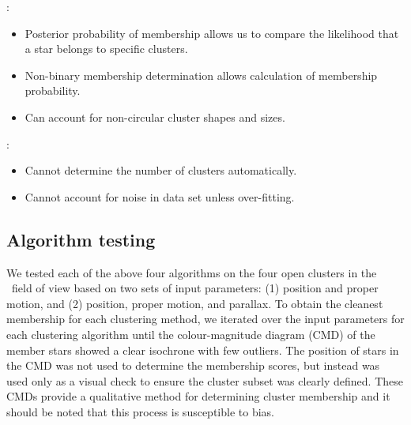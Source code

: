 : 
\begin{itemize}
    \item Posterior probability of membership allows us to compare the likelihood that a star belongs to specific clusters.
    \item Non-binary membership determination allows calculation of membership probability.
    \item Can account for non-circular cluster shapes and sizes.
\end{itemize} 

: 
\begin{itemize}
    \item Cannot determine the number of clusters automatically.
    \item Cannot account for noise in data set unless over-fitting.
\end{itemize}

\subsection{Algorithm testing}

We tested each of the above four algorithms on the four open clusters in the \Kepler~field of view based on two sets of input parameters: (1) position and proper motion, and (2) position, proper motion, and parallax. To obtain the cleanest membership for each clustering method, we iterated over the input parameters for each clustering algorithm until the colour-magnitude diagram (CMD) of the member stars showed a clear isochrone with few outliers. The position of stars in the CMD was not used to determine the membership scores, but instead was used only as a visual check to ensure the cluster subset was clearly defined. These CMDs provide a qualitative method for determining cluster membership and it should be noted that this process is susceptible to bias.

